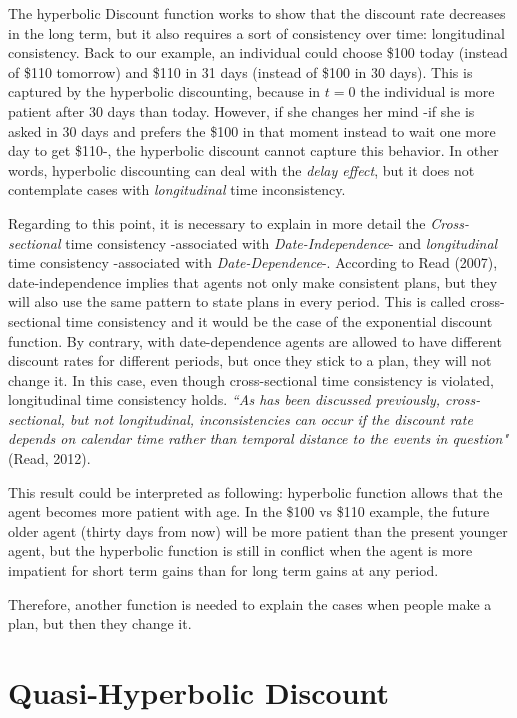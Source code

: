 \documentclass[]{article}
\begin{document}
The hyperbolic Discount function works to show that the discount rate decreases in the long term, but it also requires a sort of consistency over time: longitudinal consistency. Back to our example, an individual could choose \$100 today (instead of \$110 tomorrow) and \$110 in 31 days (instead of \$100 in 30 days). This is captured by the hyperbolic discounting, because in \(t=0\) the individual is more patient after 30 days than today. However, if she changes her mind -if she is asked in 30 days and prefers the \$100 in that moment instead to wait one more day to get \$110-, the hyperbolic discount cannot capture this behavior. In other words, hyperbolic discounting can deal with the \emph{delay effect}, but it does not contemplate cases with \emph{longitudinal} time inconsistency.

Regarding to this point, it is necessary to explain in more detail the \emph{Cross-sectional} time consistency -associated with \emph{Date-Independence}- and \emph{longitudinal} time consistency -associated with \emph{Date-Dependence}-. According to Read (2007), date-independence implies that agents not only make consistent plans, but they will also use the same pattern to state plans in every period. This is called cross-sectional time consistency and it would be the case of the exponential discount function. By contrary, with date-dependence agents are allowed to have different discount rates for different periods, but once they stick to a plan, they will not change it. In this case, even though cross-sectional time consistency is violated, longitudinal time consistency holds. \emph{``As has been discussed previously, cross-sectional, but not longitudinal, inconsistencies can occur if the discount rate depends on calendar time rather than temporal distance to the events in question"} (Read, 2012).

This result could be interpreted as following: hyperbolic function allows that the agent becomes more patient with age. In the \$100 vs \$110 example, the future older agent (thirty days from now) will be more patient than the present younger agent, but the hyperbolic function is still in conflict when the agent is more impatient for short term gains than for long term gains at any period.

Therefore, another function is needed to explain the cases when people make a plan, but then they change it.

\hypertarget{quasi-hyperbolic-discount}{%
\section{Quasi-Hyperbolic Discount}\label{quasi-hyperbolic-discount}}
\end{document}

